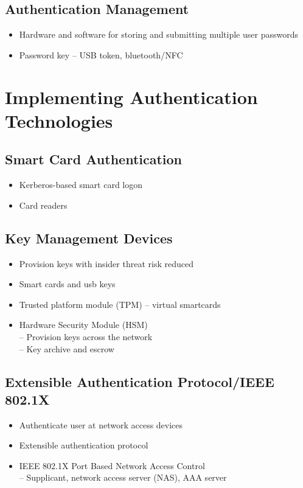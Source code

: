 	\subsection {Authentication Management}
		\begin{itemize}
			\item Hardware and software for storing and submitting multiple user passwords
			\item Password key -- USB token, bluetooth/NFC
		\end{itemize}

\section {Implementing Authentication Technologies}
	\subsection {Smart Card Authentication}
		\begin{itemize}
			\item Kerberos-based smart card logon
			\item Card readers
		\end{itemize}
	\subsection {Key Management Devices}
		\begin{itemize}
			\item Provision keys with insider threat risk reduced
			\item Smart cards and usb keys
			\item Trusted platform module (TPM) -- virtual smartcards
			\item Hardware Security Module (HSM) \\
			 -- Provision keys across the network \\
			 -- Key archive and escrow \\
		\end{itemize}
	\subsection{Extensible Authentication Protocol/IEEE 802.1X}
		\begin{itemize}
			\item Authenticate user at network access devices
			\item Extensible authentication protocol
			\item IEEE 802.1X Port Based Network Access Control \\
				-- Supplicant, network access server (NAS), AAA server
		\end{itemize}
